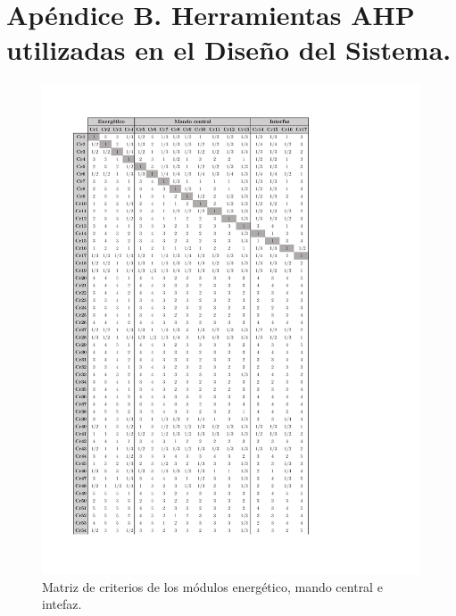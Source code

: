 \chapter{Apéndice B. Herramientas AHP utilizadas en el Diseño del Sistema.} 

\newpage
\begin{figure}[H]
	\centering
	\includegraphics[width=16cm]{imagenes/MNormal1Ex}
	\caption{Matriz de criterios de los módulos energético, mando central e intefaz.}
	\label{fig:MNormal1Ex}
\end{figure}

